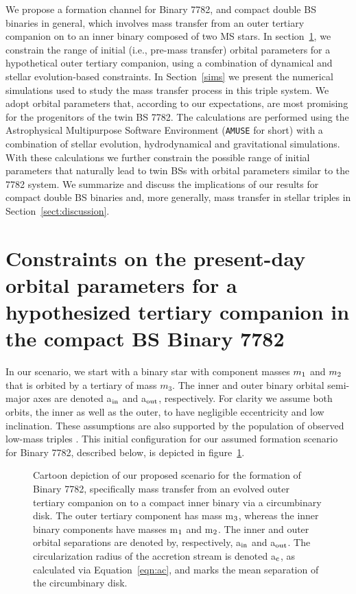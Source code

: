 \documentclass{aastex62}
\begin{document}
We propose a formation channel for Binary 7782, and compact double BS
binaries in general, which involves mass transfer from an outer
tertiary companion on to an inner binary composed of two MS 
stars.  In section~\ref{sect:dyn}, we constrain the range of initial
(i.e., pre-mass transfer) orbital parameters for a hypothetical outer
tertiary companion, using a combination of dynamical and stellar
evolution-based constraints.  In Section~\ref{sims} we present the
numerical simulations used to study the mass transfer process in this triple
system. We adopt orbital parameters that, according to our expectations,
are most promising for the progenitors of the twin BS 7782.  The calculations are
performed using the Astrophysical Multipurpose Software Environment
(\texttt{AMUSE} for short) \cite{AMUSE} with a combination of stellar
evolution, hydrodynamical and gravitational simulations.  With these
calculations we further constrain the possible range of initial
parameters that naturally lead to twin BSs with orbital parameters
similar to the 7782 system.  We summarize and discuss the implications
of our results for compact double BS binaries and, more generally,
mass transfer in stellar triples in Section~\ref{sect:discussion}.

\section{Constraints on the present-day orbital parameters for a hypothesized
         tertiary companion in the compact BS Binary 7782} \label{sect:dyn}

In our scenario, we start with a binary star with component masses
$m_{\rm 1}$ and $m_{\rm 2}$ that is orbited by a tertiary of mass
$m_3$. The inner and outer binary orbital semi-major axes are denoted
a$_{\rm in}$ and a$_{\rm out}$, respectively.  For clarity we 
assume both orbits, the inner as well as the outer, to have negligible
eccentricity and low inclination.  These assumptions are also
supported by the population of observed low-mass triples
\cite{2010yCat..73890925T,2018ApJ...854...44M}.  This initial configuration for our
assumed formation scenario for Binary 7782, described below, is
depicted in figure~\ref{fig:fig1}.

\begin{figure}[ht!]
\caption{Cartoon depiction of our proposed scenario for the formation
  of Binary 7782, specifically mass transfer from an evolved outer
  tertiary companion on to a compact inner binary via a circumbinary
  disk.  The outer tertiary component has mass m$_{\rm 3}$, whereas
  the inner binary components have masses m$_{\rm 1}$ and m$_{\rm 2}$.
  The inner and outer orbital separations are denoted by,
  respectively, a$_{\rm in}$ and a$_{\rm out}$.  The circularization
  radius of the accretion stream is denoted a$_{\rm c}$, as calculated
  via Equation~\ref{eqn:ac}, and marks the mean separation of the
  circumbinary disk.
\label{fig:fig1}}
\end{figure}
\end{document}

